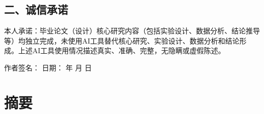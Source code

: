 \documentclass[UTF8,zihao=-4,scheme=chinese,fontset=none]{ctexart}
\begin{document}
\subsection*{二、诚信承诺}
本人承诺：毕业论文（设计）核心研究内容（包括实验设计、数据分析、结论推导等）均独立完成，未使用AI工具替代核心研究、实验设计、数据分析和结论形成。上述AI工具使用情况描述真实、准确、完整，无隐瞒或虚假陈述。

\vspace{1.5cm}
\noindent 作者签名：\hspace{5cm} 日期：\hspace{1cm} 年 \hspace{0.5cm} 月 \hspace{0.5cm} 日

\clearpage
{}
\setcounter{page}{1}
\section*{摘要}
\end{document}
